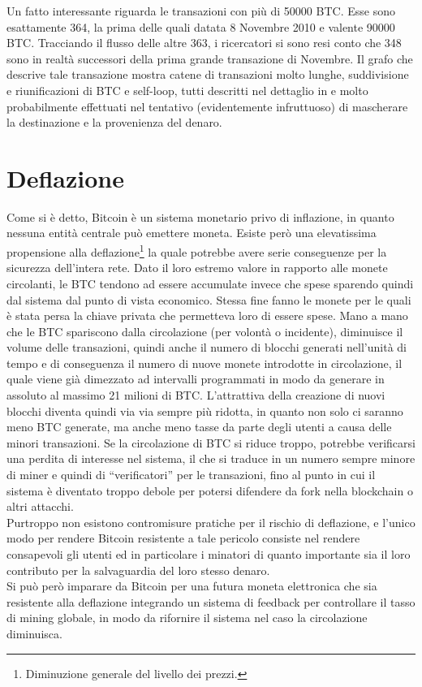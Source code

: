 Un fatto interessante riguarda le transazioni con più di 50000 BTC. Esse sono esattamente 364, la prima delle quali datata 8 Novembre 2010 e valente 90000 BTC. Tracciando il flusso delle altre 363, i ricercatori si sono resi conto che 348 sono in realtà successori della prima grande transazione di Novembre. Il grafo che descrive tale transazione mostra catene di transazioni molto lunghe, suddivisione e riunificazioni di BTC e self-loop, tutti descritti nel dettaglio in \cite{transazioni} e molto probabilmente effettuati nel tentativo (evidentemente infruttuoso) di mascherare la destinazione e la provenienza del denaro.

\section{Deflazione}\label{deflazione}

Come si è detto, Bitcoin è un sistema monetario privo di inflazione, in quanto nessuna entità centrale può emettere moneta.
Esiste però una elevatissima propensione alla deflazione\footnote{Diminuzione generale del livello dei prezzi.} la quale potrebbe avere serie conseguenze per la sicurezza dell'intera rete.
Dato il loro estremo valore in rapporto alle monete circolanti, le BTC tendono ad essere accumulate invece che spese sparendo quindi dal sistema dal punto di vista economico. Stessa fine fanno le monete per le quali è stata persa la chiave privata che permetteva loro di essere spese.
Mano a mano che le BTC spariscono dalla circolazione (per volontà o incidente), diminuisce il volume delle transazioni, quindi anche il numero di blocchi generati nell'unità di tempo e di conseguenza il numero di nuove monete introdotte in circolazione, il quale viene già dimezzato ad intervalli programmati in modo da generare in assoluto al massimo 21 milioni di BTC.
L'attrattiva della creazione di nuovi blocchi diventa quindi via via sempre più ridotta, in quanto non solo ci saranno meno BTC generate, ma anche meno tasse da parte degli utenti a causa delle minori transazioni.
Se la circolazione di BTC si riduce troppo, potrebbe verificarsi una perdita di interesse nel sistema, il che si traduce in un numero sempre minore di miner e quindi di ``verificatori'' per le transazioni, fino al punto in cui il sistema è diventato troppo debole per potersi difendere da fork nella blockchain o altri attacchi.\\
Purtroppo non esistono contromisure pratiche per il rischio di deflazione, e l'unico modo per rendere Bitcoin resistente a tale pericolo consiste nel rendere consapevoli gli utenti ed in particolare i minatori di quanto importante sia il loro contributo per la salvaguardia del loro stesso denaro.\\
Si può però imparare da Bitcoin per una futura moneta elettronica che sia resistente alla deflazione integrando un sistema di feedback per controllare il tasso di mining globale, in modo da rifornire il sistema nel caso la circolazione diminuisca.

